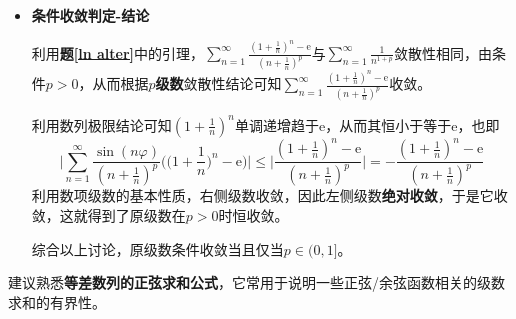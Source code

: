 \documentclass[a4paper,UTF8,fontset=windows,AutoFakeBold]{ctexart}
\newcommand*{\er}{\mathrm{e}}
\newcommand*{\suminf}[1][n=1]{\sum_{#1}^\infty}
\newcommand*{\note}{\noindent *}
\theoremstyle{ex}
\newcommand{\exref}[1]{\textbf{题\;\ref{#1}\;}}
\begin{document}
\begin{framed}
{\begin{itemize}
        为了进行估算，我们先考虑$\big(1+\frac{1}{n}\big)^n-\er$。将$\frac{1}{n}$替换为趋于0的$x$，此式即为
        $$(1+x)^{\frac{1}{x}}-\er=\er^{\frac{\ln(1+x)}{x}}-\er=\er\big(\er^{\frac{\ln(1+x)-x}{x}}-1\big)$$
        利用基本等价无穷小结论可知$x\to0$时$\ln(1+x)\sim x$，从而此时$\frac{\ln(1+x)-x}{x}\to0$，则利用$t\to0$时$\er^t-1\sim t$可进行\textbf{等价无穷小替换}得到
        $$(1+x)^{\frac{1}{x}}-\er\sim\er\frac{\ln(1+x)-x}{x}\quad(x\to0)$$
        为了进一步计算，将$\ln(1+x)$在0处展开到二阶可得
        $$\ln(1+x)=x-\frac{x^2}{2}+o(x^2)\quad(x\to0)$$
        从而(涉及的$o$运算性质可见上学期讲义11.3.2)
        $$\er\frac{\ln(1+x)-x}{x}=\er\frac{-\frac{x^2}{2}+o(x^2)}{x}=-\frac{\er}{2}x+o(x)\quad(x\to0)$$
        由此利用$o(x)$的定义可得到
        $$\er\frac{\ln(1+x)-x}{x}\sim-\frac{\er}{2}x\quad(x\to0)$$
        也即最终得到
        $$(1+x)^{\frac{1}{x}}-\er\sim-\frac{\er}{2}x\quad(x\to0)$$
        将其写为
        $$\lim_{x\to0}\frac{(1+x)^{\frac{1}{x}}-\er}{x}=-\frac{\er}{2}$$
        利用\textbf{归结原理}可以得到
        $$\lim_{n\to\infty}\frac{(1+\frac{1}{n})^n-\er}{\frac{1}{n}}=\lim_{x\to0}\frac{(1+x)^{\frac{1}{x}}-\er}{x}=-\frac{\er}{2}$$
        而第一部分证明中已经证明了
        $$\lim_{n\to\infty}\frac{\frac{1}{(n+\frac{1}{n})^p}}{\frac{1}{n^p}}=1$$
        综合得到
        $$\lim_{n\to\infty}\frac{\frac{(1+\frac{1}{n})^n-\er}{(n+\frac{1}{n})^p}}{\frac{1}{n^{1+p}}}=-\frac{\er}{2}\cdot1=-\frac{\er}{2}$$

        \item \textbf{条件收敛判定-结论}
        
        利用\exref{ln alter}中的引理，$\suminf\frac{(1+\frac{1}{n})^n-\er}{(n+\frac{1}{n})^p}$与$\suminf\frac{1}{n^{1+p}}$敛散性相同，由条件$p>0$，从而根据\textbf{$p$级数}敛散性结论可知$\suminf\frac{(1+\frac{1}{n})^n-\er}{(n+\frac{1}{n})^p}$收敛。

        利用数列极限结论可知$(1+\frac{1}{n})^n$单调递增趋于$\er$，从而其恒小于等于$\er$，也即
        $$\bigg|\suminf\frac{\sin(n\varphi)}{(n+\frac{1}{n})^p}\bigg(\bigg(1+\frac{1}{n}\bigg)^n-\er\bigg)\bigg|\le\bigg|\frac{(1+\frac{1}{n})^n-\er}{(n+\frac{1}{n})^p}\bigg|=-\frac{(1+\frac{1}{n})^n-\er}{(n+\frac{1}{n})^p}$$
        利用数项级数的基本性质，右侧级数收敛，因此左侧级数\textbf{绝对收敛}，于是它收敛，这就得到了原级数在$p>0$时恒收敛。

        综合以上讨论，原级数条件收敛当且仅当$p\in(0,1]$。
    \end{itemize}
}
\end{framed}

\note 建议熟悉\textbf{等差数列的正弦求和公式}，它常用于说明一些正弦/余弦函数相关的级数求和的有界性。
\end{document}
